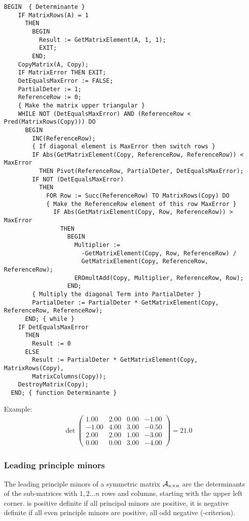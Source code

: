 \begin{refsection}
\begin{lstlisting}[caption=Determinant of a matrix]
  BEGIN  { Determinante }
    IF MatrixRows(A) = 1
      THEN
        BEGIN
          Result := GetMatrixElement(A, 1, 1);
          EXIT;
        END;
    CopyMatrix(A, Copy);
    IF MatrixError THEN EXIT;
    DetEqualsMaxError := FALSE;
    PartialDeter := 1;
    ReferenceRow := 0;
    { Make the matrix upper triangular }
    WHILE NOT (DetEqualsMaxError) AND (ReferenceRow < Pred(MatrixRows(Copy))) DO
      BEGIN
        INC(ReferenceRow);
        { If diagonal element is MaxError then switch rows }
        IF Abs(GetMatrixElement(Copy, ReferenceRow, ReferenceRow)) < MaxError
          THEN Pivot(ReferenceRow, PartialDeter, DetEqualsMaxError);
        IF NOT (DetEqualsMaxError)
          THEN
            FOR Row := Succ(ReferenceRow) TO MatrixRows(Copy) DO
            { Make the ReferenceRow element of this row MaxError }
              IF Abs(GetMatrixElement(Copy, Row, ReferenceRow)) > MaxError
                THEN
                  BEGIN
                    Multiplier :=
                      -GetMatrixElement(Copy, Row, ReferenceRow) /
                      GetMatrixElement(Copy, ReferenceRow, ReferenceRow);
                    EROmultAdd(Copy, Multiplier, ReferenceRow, Row);
                  END;
        { Multiply the diagonal Term into PartialDeter }
        PartialDeter := PartialDeter * GetMatrixElement(Copy, ReferenceRow, ReferenceRow);
      END; { while }
    IF DetEqualsMaxError
      THEN
        Result := 0
      ELSE
        Result := PartialDeter * GetMatrixElement(Copy, MatrixRows(Copy),
        MatrixColumns(Copy));
    DestroyMatrix(Copy);
  END; { function Determinante }
\end{lstlisting}

Example:
\begin{gather}
   \det
   \begin{pmatrix}
      1.00 & 2.00 & 0.00 & -1.00 \\
     -1.00 & 4.00 & 3.00 & -0.50 \\
      2.00 & 2.00 & 1.00 & -3.00 \\
      0.00 & 0.00 & 3.00 & -4.00
   \end{pmatrix} = 21.0
\end{gather}

\subsubsection{Leading principle minors}

The leading principle minors of a symmetric matrix \(\mathcal{A}_{n \times n} \) are the determinants of the sub-matrices with \(1, 2\ldots n \) rows and columns, starting with the upper left corner.  is positive definite if all principal minors are positive, it is negative definite if all even principle minors are positive, all odd negative (-criterion).


\end{refsection}
